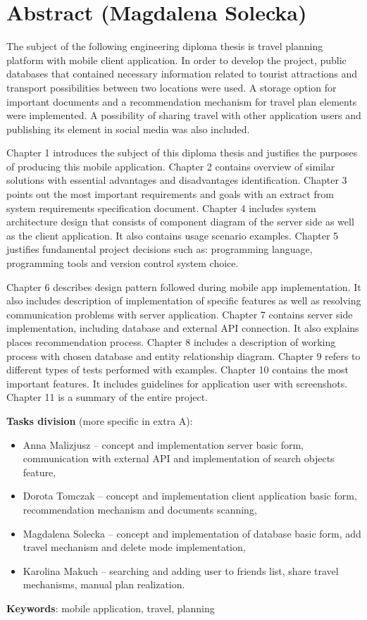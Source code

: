 \chapter*{Abstract (Magdalena Solecka)}
\par The subject of the following engineering diploma thesis is travel planning 
platform with mobile client application. In order to develop the project, public 
databases that contained necessary information related to tourist attractions and 
transport possibilities between two locations were used. A storage option for important 
documents and a recommendation mechanism for travel plan elements were implemented. 
A possibility of sharing travel with other application users and publishing its element 
in social media was also included.
 
\par Chapter 1 introduces the subject of this diploma thesis and justifies the purposes 
of producing this mobile application. 
Chapter 2 contains overview of similar solutions with essential advantages and 
disadvantages identification.
Chapter 3 points out the most important requirements and goals with an extract from 
system requirements specification document.
Chapter 4 includes system architecture design that consists of component diagram of 
the server side as well as the client application. It also contains usage scenario 
examples.
Chapter 5 justifies fundamental project decisions such as: programming language, 
programming tools and version control system choice.

\par Chapter 6 describes design pattern followed during mobile app implementation. It 
also includes description of implementation of specific features as well as resolving 
communication problems with server application.
Chapter 7 contains server side implementation, including database and external API connection.
It also explains places recommendation process. 
Chapter 8 includes a description of working process with chosen database and entity 
relationship diagram.
Chapter 9 refers to different types of tests performed with examples.
Chapter 10 contains the most important features. It includes guidelines for 
application user with screenshots.
Chapter 11 is a summary of the entire project.

\par \textbf{Tasks division} (more specific in extra A):
\begin{itemize}
\item Anna Malizjusz -- concept and implementation server basic form, communication with 
external API and implementation of search objects feature,
\item Dorota Tomczak -- concept and implementation client application basic form, 
recommendation mechanism and documents scanning,
\item Magdalena Solecka -- concept and implementation of database basic form, add travel 
mechanism and delete mode implementation,
\item Karolina Makuch -- searching and adding user to friends list, share travel 
mechanisms, manual plan realization.
\end{itemize}
\textbf{Keywords}: mobile application, travel, planning